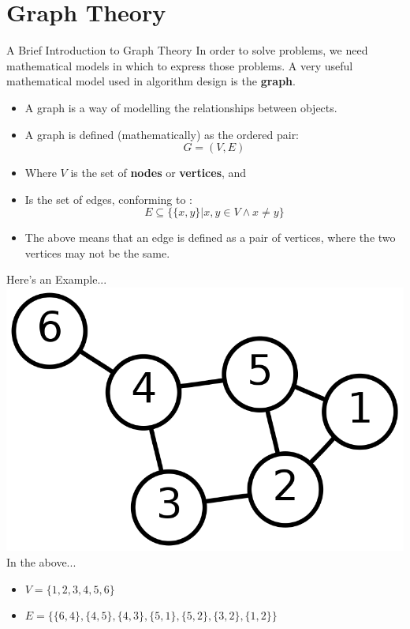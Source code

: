\documentclass[11pt]{beamer}
\begin{document}
\section[Graphs]{Graph Theory}
\begin{frame}{A Brief Introduction to Graph Theory}
In order to solve problems, we need mathematical models in which to express those problems.  A very useful mathematical model used in algorithm design is the \textbf{graph}.
\begin{itemize}
\item A graph is a way of modelling the relationships between objects.
\item A graph is defined (mathematically) as the ordered pair: 
$$ G = (V, E) $$
\item Where $V$ is the set of  \textbf{nodes} or \textbf{vertices}, and
\item Is the set of edges, conforming to : 
$$E \subseteq \{\{x,y\} | x,y \in V \wedge x \neq y\} $$
\item The above means that an edge is defined as a pair of vertices, where the two vertices may not be the same. 
\end{itemize}
\end{frame}

\begin{frame}{Here's an Example...}
\center 
\includegraphics[scale=0.2]{graph.png}
\flushleft
In the above...
\begin{itemize}
\item $V = \{1,2,3,4,5,6\}$
\item $E = \{\{6,4\},\{4,5\},\{4,3\},\{5,1\},\{5,2\},\{3,2\},\{1,2\}\}$
\end{itemize}
\end{frame}
\end{document}
